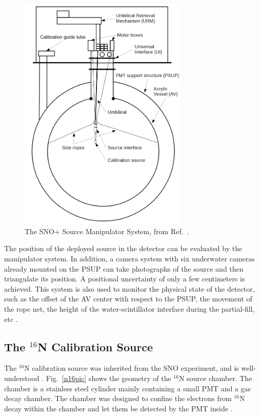 \begin{figure}[!htb]
	\centering
	\includegraphics[width=8cm]{SMS.png}
	\caption[The SNO+ Source Manipulator System.]{The SNO+ Source Manipulator System, from Ref.~\cite{snop_jinst}.}
	\label{fig:sms}
\end{figure}

The position of the deployed source in the detector can be evaluated by the manipulator system. In addition, a camera system with six underwater cameras already mounted on the PSUP can take photographs of the source and then triangulate its position. A positional uncertainty of only a few centimeters is achieved. This system is also used to monitor the physical state of the detector, such as the offset of the AV center with respect to the PSUP, the movement of the rope net, the height of the water-scintillator interface during the partial-fill, etc \cite{singh2020underwater,snop_jinst}.

\subsection{The $^{16}$N Calibration Source}\label{sect:n16}

The $^{16}$N calibration source was inherited from the SNO experiment, and is well-understood \cite{dragowsky1999sudbury,dragowsky200216n,hamer2001energy}. Fig.~\ref{n16pic} shows the geometry of the $^{16}$N source chamber. The chamber is a stainless steel cylinder mainly containing a small PMT and a gas decay chamber. The chamber was designed to confine the electrons from $^{16}$N decay within the chamber and let them be detected by the PMT inside \cite{dragowsky1999sudbury}.

